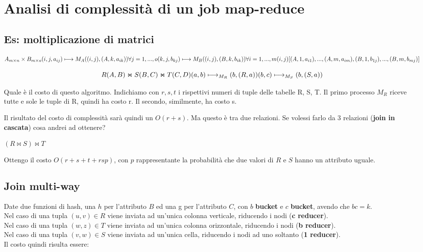 \documentclass[\main/main.tex]{subfiles}
\begin{document}
\section{Analisi di complessità di un job map-reduce}

\subsection{Es: moltiplicazione di matrici}

\[
	A_{m\times n} \times B_{m \times o} \\
	(i,j,a_{ij}) \longmapsto{M_A} ((i,j), (A, k, a_{ik})) \forall j = 1,...,o \\
	(k,j,b_{kj}) \longmapsto{M_B} ((i,j), (B, k, b_{ik})) \forall i = 1,...,m \\
	(i,j)[(A, 1, a_{i1}), ..., (A, m, a_{im}), (B, 1, b_{1j}), ..., (B, m, b_{mj})]
\]


\[
	R(A,B) \Join S(B,C) \Join T(C,D) \\
	(a, b) \longmapsto_{M_R} (b, (R,a))\\
	(b, c) \longmapsto_{M_S} (b, (S,a))\\
\]

Quale è il costo di questo algoritmo.
Indichiamo con $r, s, t$ i rispettivi numeri di tuple delle tabelle R, S, T.
Il primo processo $M_R$ riceve tutte e sole le tuple di R, quindi ha costo r. Il secondo, similmente, ha costo s.

Il risultato del costo di complessità sarà quindi un $O(r+s)$. Ma questo è tra due relazioni. Se volessi farlo da 3 relazioni (\textbf{join in cascata}) cosa andrei ad ottenere?

$(R \Join S) \Join T$

Ottengo il costo $O(r+s+t+rsp)$, con $p$ rappresentante la probabilità che due valori di $R$ e $S$ hanno un attributo uguale.

\subsection{Join multi-way}
Date due funzioni di hash, una $h$ per l'attributo $B$ ed una g per l'attributo $C$, con $b$ \textbf{bucket} e $c$ \textbf{bucket}, avendo che $bc = k$.
\\
Nel caso di una tupla $(u,v) \in R$ viene inviata ad un'unica colonna verticale, riducendo i nodi (\textbf{c reducer}).
\\
Nel caso di una tupla $(w,z) \in T$ viene inviata ad un'unica colonna orizzontale, riducendo i nodi (\textbf{b reducer}).
\\
Nel caso di una tupla $(v,w) \in S$ viene inviata ad un'unica cella, riducendo i nodi ad uno soltanto (\textbf{1 reducer}).
\\
Il costo quindi risulta essere:
\end{document}
